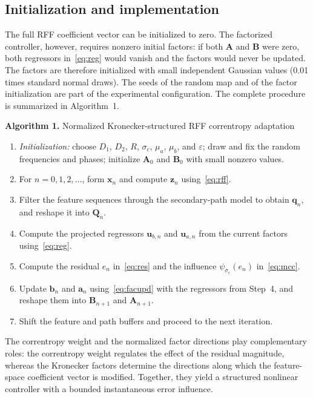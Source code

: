 \documentclass[preprint,12pt]{elsarticle}
\begin{document}
\subsection{Initialization and implementation}

The full RFF coefficient vector can be initialized to zero. The factorized controller, however, requires nonzero initial factors: if both $\mathbf{A}$ and $\mathbf{B}$ were zero, both regressors in~\eqref{eq:reg} would vanish and the factors would never be updated. The factors are therefore initialized with small independent Gaussian values (0.01 times standard normal draws). The seeds of the random map and of the factor initialization are part of the experimental configuration. The complete procedure is summarized in Algorithm~1.

\medskip
\noindent\textbf{Algorithm 1.} Normalized Kronecker-structured RFF correntropy adaptation
\begin{enumerate}
\item \emph{Initialization:} choose $D_1$, $D_2$, $R$, $\sigma_c$, $\mu_a$, $\mu_b$, and $\varepsilon$; draw and fix the random frequencies and phases; initialize $\mathbf{A}_0$ and $\mathbf{B}_0$ with small nonzero values.
\item For $n = 0, 1, 2, \ldots$, form $\mathbf{x}_n$ and compute $\mathbf{z}_n$ using~\eqref{eq:rff}.
\item Filter the feature sequences through the secondary-path model to obtain $\mathbf{q}_n$, and reshape it into $\mathbf{Q}_n$.
\item Compute the projected regressors $\mathbf{u}_{b,n}$ and $\mathbf{u}_{a,n}$ from the current factors using~\eqref{eq:reg}.
\item Compute the residual $e_n$ in~\eqref{eq:res} and the influence $\psi_{\sigma_c}(e_n)$ in~\eqref{eq:mcc}.
\item Update $\mathbf{b}_n$ and $\mathbf{a}_n$ using~\eqref{eq:facupd} with the regressors from Step~4, and reshape them into $\mathbf{B}_{n+1}$ and $\mathbf{A}_{n+1}$.
\item Shift the feature and path buffers and proceed to the next iteration.
\end{enumerate}
\medskip

The correntropy weight and the normalized factor directions play complementary roles: the correntropy weight regulates the effect of the residual magnitude, whereas the Kronecker factors determine the directions along which the feature-space coefficient vector is modified. Together, they yield a structured nonlinear controller with a bounded instantaneous error influence.
\end{document}
